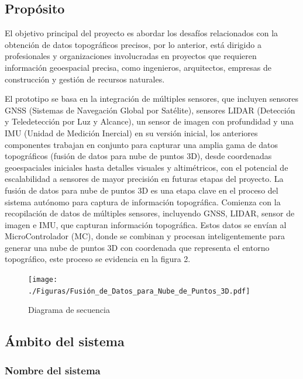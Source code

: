 \documentclass[12pt,a4paper, twoside]{article} %
\begin{document}
\newpage


\subsection{Propósito}
\label{sec:org434c3ef}

El objetivo principal del proyecto es abordar los desafíos relacionados con la obtención de datos topográficos precisos, por lo anterior, está dirigido a profesionales y organizaciones involucradas en proyectos que requieren información geoespacial precisa, como ingenieros, arquitectos, empresas de construcción y gestión de recursos naturales.

El prototipo se basa en la integración de múltiples sensores, que incluyen sensores GNSS (Sistemas de Navegación Global por Satélite), sensores LIDAR (Detección y Teledetección por Luz y Alcance), un sensor de imagen con profundidad y una IMU (Unidad de Medición Inercial) en su versión inicial, los anteriores componentes trabajan en conjunto para capturar una amplia gama de datos topográficos (fusión de datos  para nube de puntos 3D), desde coordenadas geoespaciales iniciales hasta detalles visuales y altimétricos, con el potencial de escalabilidad a sensores de mayor precisión en futuras etapas del proyecto. La fusión de datos para nube de puntos 3D es una etapa clave en el proceso del sistema autónomo para captura de información topográfica. Comienza con la recopilación de datos de múltiples sensores, incluyendo GNSS, LIDAR, sensor de imagen e IMU, que capturan información topográfica. Estos datos se envían al MicroControlador (MC), donde se combinan y procesan inteligentemente para generar una nube de puntos 3D con coordenada que representa el entorno topográfico, este proceso se   evidencia en la figura 2.

\begin{figure}[htpb]
\centering 
\texttt{[image: ./Figuras/Fusión\_de\_Datos\_para\_Nube\_de\_Puntos\_3D.pdf]}
\caption{Diagrama de secuencia}
\label{fig:diagBloques}
\end{figure}




\subsection{Ámbito del sistema}
\label{sec:org12e44a1}


\subsubsection{Nombre del sistema}
\label{subsec:org12e44a2}
\end{document}
